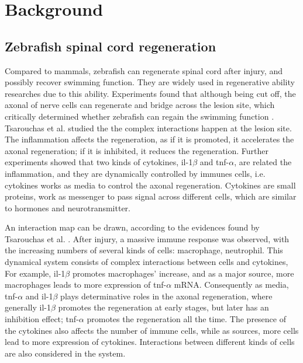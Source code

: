 \chapter{Background}

\section{Zebrafish spinal cord regeneration}


Compared to mammals, zebrafish can regenerate spinal cord after injury, and possibly recover swimming function. They are widely used in regenerative ability researches due to this ability. Experiments found that although being cut off, the axonal of nerve cells can regenerate and bridge across the lesion site, which critically determined whether zebrafish can regain the swimming function \cite{axonal}. Tsarouchas et al. \cite{ref:Tsarouchas} studied the the complex interactions happen at the lesion site. The inflammation affects the regeneration, as if it is promoted, it accelerates the axonal regeneration; if it is inhibited, it reduces the regeneration. Further experiments showed that two kinds of cytokines, il-1$\beta$ and tnf-$\alpha$, are related the inflammation, and they are dynamically controlled by immunes cells, i.e. cytokines works as media to control the axonal regeneration. Cytokines are small proteins, work as messenger to pass signal across different cells, which are similar to hormones and neurotransmitter.

An interaction map can be drawn, according to the evidences found by Tsarouchas et al. \cite{ref:Tsarouchas}. After injury, a massive immune response was observed, with the increasing numbers of several kinds of cells: macrophage, neutrophil. This dynamical system consists of complex interactions between cells and cytokines, For example, il-1$\beta$ promotes macrophages' increase, and as a major source, more macrophages leads to more expression of tnf-$\alpha$ mRNA. Consequently as media, tnf-$\alpha$ and il-1$\beta$ plays determinative roles in the axonal regeneration, where generally il-1$\beta$ promotes the regeneration at early stages, but later has an inhibition effect; tnf-$\alpha$ promotes the regeneration all the time. The presence of the cytokines also affects the number of immune cells, while as sources, more cells lead to more expression of cytokines. Interactions between different kinds of cells are also considered in the system.

